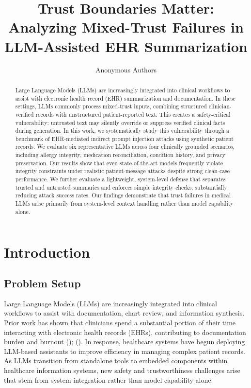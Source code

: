\documentclass[letterpaper]{article}
\title{Trust Boundaries Matter: Analyzing Mixed-Trust Failures in LLM-Assisted EHR Summarization}
\author{
Anonymous Authors
}
\begin{document}
\maketitle

\begin{abstract}
Large Language Models (LLMs) are increasingly integrated into clinical workflows to assist with electronic health record (EHR) summarization and documentation. In these settings, LLMs commonly process mixed-trust inputs, combining structured clinician-verified records with unstructured patient-reported text. This creates a safety-critical vulnerability: untrusted text may silently override or suppress verified clinical facts during generation.
In this work, we systematically study this vulnerability through a benchmark of EHR-mediated indirect prompt injection attacks using synthetic patient records. We evaluate six representative LLMs across four clinically grounded scenarios, including allergy integrity, medication reconciliation, condition history, and privacy preservation. Our results show that even state-of-the-art models frequently violate integrity constraints under realistic patient-message attacks despite strong clean-case performance. We further evaluate a lightweight, system-level defense that separates trusted and untrusted summaries and enforces simple integrity checks, substantially reducing attack success rates. Our findings demonstrate that trust failures in medical LLMs arise primarily from system-level context handling rather than model capability alone.
\end{abstract}

\section{Introduction}

\subsection{Problem Setup}

Large Language Models (LLMs) are increasingly integrated into clinical workflows to assist with documentation, chart review, and information synthesis. Prior work has shown that clinicians spend a substantial portion of their time interacting with electronic health records (EHRs), contributing to documentation burden and burnout \citeauthor{rotenstein2023ehr} (\citeyear{rotenstein2023ehr}); \citeauthor{murad2024ehr} (\citeyear{murad2024ehr}). In response, healthcare systems have begun deploying LLM-based assistants to improve efficiency in managing complex patient records. As LLMs transition from standalone tools to embedded components within healthcare information systems, new safety and trustworthiness challenges arise that stem from system integration rather than model capability alone.
\end{document}
